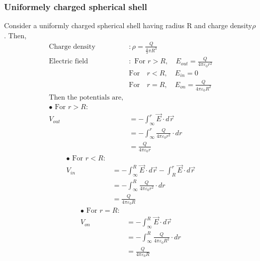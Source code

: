 \subsubsection{Uniformely charged spherical shell}
Consider a uniformly charged spherical shell having radius $\mathrm{R}$ and charge density$\rho$. Then,
\begin{align*}
\text{Charge density}&:\rho=\frac{Q}{\frac{4}{3} \pi R^{3}}\\
\text{Electric field}&:\text { For } r>R , \quad E_{out}=\frac{Q}{4 \pi \varepsilon_{0} r^{2}}
\\&\text {For}\quad r<R, \quad E_{in}=0
\\&\text {For}\quad r=R, \quad E_{on}=\frac{Q}{4 \pi \varepsilon_{0} R^{2}}\\
\text{Then the potentials are,}\\
	\bullet\text { For } r>R:\\
	V_{out}&=-\int_{\infty}^{r} \vec{E}\cdot d \vec{r}\\
	&=-\int_{\infty}^{r} \frac{Q}{4 \pi \varepsilon_{0} r^{2}}\cdot d {r}\\
	&=\frac{Q}{4 \pi \varepsilon_{0} r}
	\end{align*}
    \begin{align*}
 	\bullet	\text { For } r<R:\\
	V_{in}&=-\int_{\infty}^{R} \vec{E}\cdot d \vec{r}-\int_{R}^{r} \vec{E}\cdot d \vec{r}\\
	&=-\int_{\infty}^{R} \frac{Q}{4 \pi \varepsilon_{0} r^{2}} \cdot d {r}\\
	&=\frac{Q}{4 \pi \varepsilon_{0} R}
	\end{align*}
	 \begin{align*}
		\bullet \text { For } r=R:\\
	V_{on}&=-\int_{\infty}^{R} \vec{E}\cdot d \vec{r}\\
	&=-\int_{\infty}^{R} \frac{Q}{4 \pi \varepsilon_{0} R^{2}}\cdot d {r}\\
	&=\frac{Q}{4 \pi \varepsilon_{0} R}
	\end{align*}

\begin{center}
\end{center}

